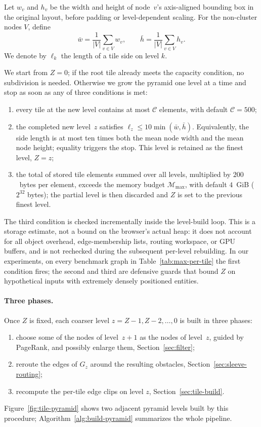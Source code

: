 \documentclass[review]{vgtc}          %
\begin{document}
Let $w_v$ and $h_v$ be the width and height of node~$v$'s
axis-aligned bounding box in the original layout, before padding or
level-dependent scaling. For the non-cluster nodes $V$, define
\[
  \bar w=\frac{1}{|V|}\sum_{v\in V}w_v,\qquad
  \bar h=\frac{1}{|V|}\sum_{v\in V}h_v.
\]
We denote by $\ell_k$ the length of a tile side on level $k$.

We start from $Z=0$; if the root tile already meets the capacity
condition, no subdivision is needed. Otherwise we grow the pyramid
one level at a time and stop as soon as any of three conditions is met:
\begin{enumerate}
\item every tile at the new level contains at most $\mathcal{C}$
elements, with default $\mathcal{C}=500$;
\item the completed new level~$z$ satisfies
  $\ell_z\leq 10\min(\bar w,\bar h)$.
  Equivalently, the side length is at most ten times both the mean
  node width and the mean node height; equality triggers the stop.
  This level is retained as the finest level, $Z=z$;
\item the total of stored tile elements summed over all levels, multiplied by
$200$~bytes per element, exceeds the memory budget $\mathcal{M}_{\max}$,
with default $4$~GiB ($2^{32}$ bytes); the partial level is then discarded and $Z$ is
set to the previous finest level.
\end{enumerate}
The third condition is checked incrementally inside the level-build
loop. This is a storage estimate, not a bound on the browser's actual
heap: it does not account for all object overhead, edge-membership
lists, routing workspace, or GPU buffers, and is not rechecked during
the subsequent per-level rebuilding. In our experiments, on every
benchmark graph in Table~\ref{tab:max-per-tile} the first condition
fires; the second and third are defensive guards that bound $Z$ on
hypothetical inputs with extremely densely positioned entities.
\paragraph{Three phases.} Once $Z$ is fixed,
each coarser level $z=Z{-}1, Z{-}2, \dots, 0$ is built in three
phases:
\begin{enumerate}
\item choose some of the nodes of level~$z+1$ as the nodes of
  level~$z$, guided by PageRank, and possibly enlarge them,
  Section~\ref{sec:filter};
\item reroute the edges of $G_z$ around the resulting obstacles,
  Section~\ref{sec:sleeve-routing};
\item recompute the per-tile edge clips on level $z$,
  Section~\ref{sec:tile-build}.
\end{enumerate}
Figure~\ref{fig:tile-pyramid} shows two adjacent pyramid levels built
by this procedure; Algorithm~\ref{alg:build-pyramid} summarizes the
whole pipeline.
\end{document}
